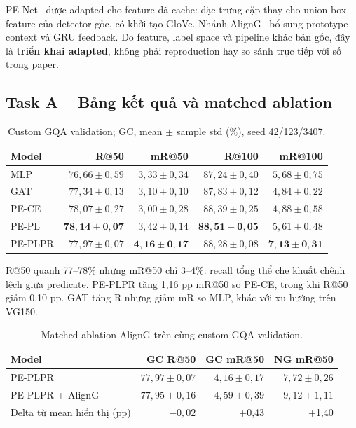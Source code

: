 PE-Net~\cite{zheng2023penet} được adapted cho feature đã cache:
đặc trưng cặp thay cho union-box feature của detector gốc, có khởi tạo GloVe.
Nhánh AlignG~\cite{jung2026aligng} bổ sung prototype context và GRU feedback.
Do feature, label space và pipeline khác bản gốc, đây là \textbf{triển khai
adapted}, không phải reproduction hay so sánh trực tiếp với số trong paper.



\subsection{Task A -- Bảng kết quả và matched ablation}
\begin{table}[!t]\centering\small
\caption{Custom GQA validation; GC, mean $\pm$ sample std (\%), seed 42/123/3407.}\label{tab:gqa}
\begin{tabular}{@{}lrrrr@{}}\toprule
Model & R@50 & mR@50 & R@100 & mR@100\\\midrule
MLP & $76,66\pm0,59$ & $3,33\pm0,34$ & $87,24\pm0,40$ & $5,68\pm0,75$\\
GAT & $77,34\pm0,13$ & $3,10\pm0,10$ & $87,83\pm0,12$ & $4,84\pm0,22$\\
PE-CE & $78,07\pm0,27$ & $3,00\pm0,28$ & $88,39\pm0,25$ & $4,88\pm0,58$\\
PE-PL & $\mathbf{78,14\pm0,07}$ & $3,42\pm0,14$ & $\mathbf{88,51\pm0,05}$ & $5,61\pm0,48$\\
PE-PLPR & $77,97\pm0,07$ & $\mathbf{4,16\pm0,17}$ & $88,28\pm0,08$ & $\mathbf{7,13\pm0,31}$\\
\bottomrule\end{tabular}\end{table}

R@50 quanh 77--78\% nhưng mR@50 chỉ 3--4\%: recall tổng thể che khuất chênh lệch
giữa predicate. PE-PLPR tăng 1,16 pp mR@50 so PE-CE, trong khi R@50
giảm 0,10 pp. GAT tăng R nhưng giảm mR so MLP, khác với xu hướng trên VG150.

\begin{table}[!t]\centering\small
\caption{Matched ablation AlignG trên cùng custom GQA validation.}\label{tab:aligng}
\begin{tabular}{@{}lrrr@{}}\toprule
Model & GC R@50 & GC mR@50 & NG mR@50\\\midrule
PE-PLPR & $77,97\pm0,07$ & $4,16\pm0,17$ & $7,72\pm0,26$\\
PE-PLPR + AlignG & $77,95\pm0,16$ & $4,59\pm0,39$ & $9,12\pm1,11$\\
Delta từ mean hiển thị (pp) & $-0,02$ & +0,43 & +1,40\\
\bottomrule\end{tabular}\end{table}

